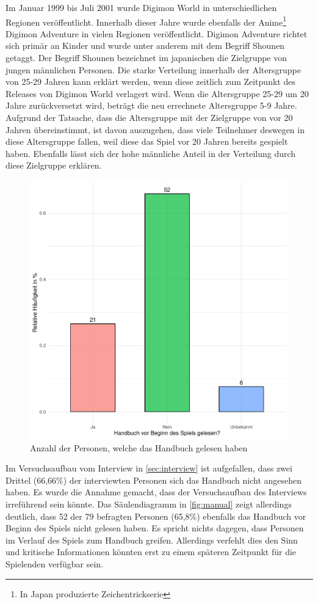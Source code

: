 Im Januar 1999 bis Juli 2001 wurde Digimon World in unterschiedlichen Regionen veröffentlicht.
Innerhalb dieser Jahre wurde ebenfalls der Anime\footnote{In Japan produzierte Zeichentrickserie} Digimon Adventure in vielen Regionen veröffentlicht\cite{imdb-release}.
Digimon Adventure richtet sich primär an Kinder\cite{mal-adventure} und wurde unter anderem mit dem Begriff Shounen getaggt\cite{anidb-adventure}.
Der Begriff Shounen bezeichnet im japanischen die Zielgruppe von jungen männlichen Personen\cite{manga-brunner}.
Die starke Verteilung innerhalb der Altersgruppe von 25-29 Jahren kann erklärt werden, wenn diese zeitlich zum Zeitpunkt des Releases von Digimon World verlagert wird.
Wenn die Altersgruppe 25-29 um 20 Jahre zurückversetzt wird, beträgt die neu errechnete Altersgruppe 5-9 Jahre.
Aufgrund der Tatsache, dass die Altersgruppe mit der Zielgruppe von vor 20 Jahren übereinstimmt, ist davon auszugehen, dass viele Teilnehmer deswegen in diese Altersgruppe fallen, weil diese das Spiel vor 20 Jahren bereits gespielt haben.
Ebenfalls lässt sich der hohe männliche Anteil in der Verteilung durch diese Zielgruppe erklären. \\

\begin{figure}[H]
  \centering
  \includegraphics[width=0.65\columnwidth]{figures/plots/manual.pdf}
  \caption{\label{fig:manual} Anzahl der Personen, welche das Handbuch gelesen haben}
\end{figure}

Im Versuchsaufbau vom Interview in \autoref{sec:interview} ist aufgefallen, dass zwei Drittel (66,66\%) der interviewten Personen sich das Handbuch nicht angesehen haben.
Es wurde die Annahme gemacht, dass der Versuchsaufbau des Interviews irreführend sein könnte.
Das Säulendiagramm in \autoref{fig:manual} zeigt allerdings deutlich, dass 52 der 79 befragten Personen (65,8\%) ebenfalls das Handbuch vor Beginn des Spiels nicht gelesen haben.
Es spricht nichts dagegen, dass Personen im Verlauf des Spiels zum Handbuch greifen.
Allerdings verfehlt dies den Sinn und kritische Informationen könnten erst zu einem späteren Zeitpunkt für die Spielenden verfügbar sein.\\


